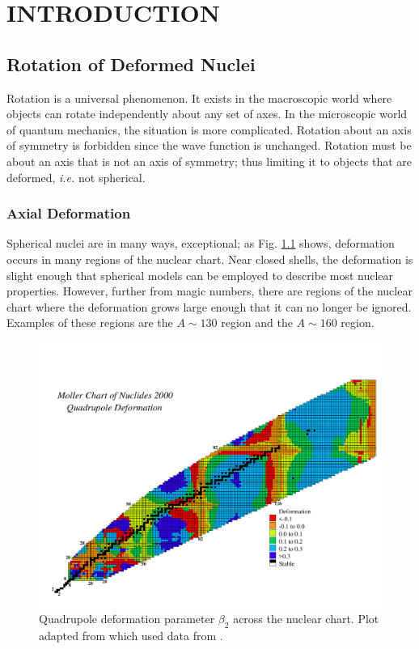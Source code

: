 %
%

\chapter{INTRODUCTION}
\label{chp:intro}
\section{Rotation of Deformed Nuclei}
\label{sec:intro-rot-def-nuc}
Rotation is a universal phenomenon. It exists in the macroscopic world where objects can rotate independently about any set of axes. In the microscopic world of quantum mechanics, the situation is more complicated. Rotation about an axis of symmetry is forbidden since the wave function is unchanged. Rotation must be about an axis that is not an axis of symmetry; thus limiting it to objects that are deformed, \emph{i.e.} not spherical.

\subsection{Axial Deformation}
\label{ssec:intro-rot-axial-def}
Spherical nuclei are in many ways, exceptional; as Fig. \ref{fig:chp1-quad-def} shows, deformation occurs in many regions of the nuclear chart. Near closed shells, the deformation is slight enough that spherical models can be employed to describe most nuclear properties. However, further from magic numbers, there are regions of the nuclear chart where the deformation grows large enough that it can no longer be ignored. Examples of these regions are the $A\sim{}130$ region and the $A\sim{}160$ region.

\begin{figure}[t!]
\centerline{\includegraphics[width=\textwidth,clip=true,trim=0 0 0 75]{./img/c1/chart_thb2.pdf}}
	\caption{Quadrupole deformation parameter $\beta_2$ across the nuclear chart. Plot adapted from \cite{nilssonDiagrams} which used data from \cite{mollerGroundStateDef}.\label{fig:chp1-quad-def}}
\end{figure}

